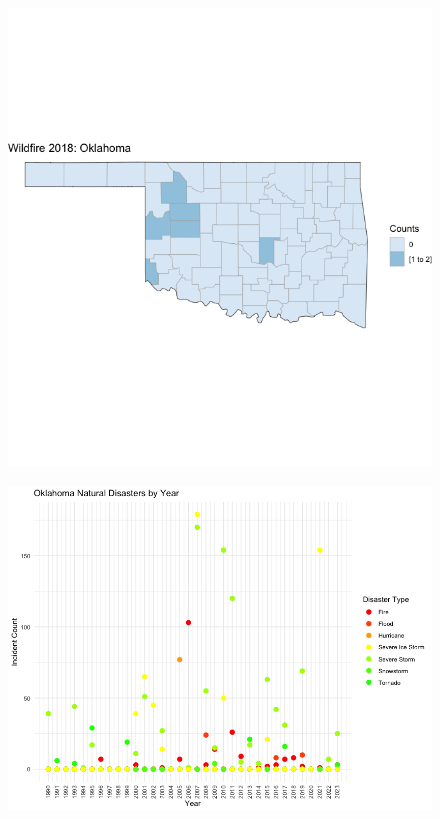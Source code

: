 \documentclass[letterpaper]{article}
\begin{document}
\begin{figure}[h]
  \caption{}
  \label{}
  \centering
    \includegraphics[width=1\textwidth]{PS6b_Dong.png}
\end{figure}

\begin{figure}[h]
  \caption{}
  \label{}
  \centering
    \includegraphics[width=1\textwidth]{PS6c_Dong.png}
\end{figure}
\end{document}
